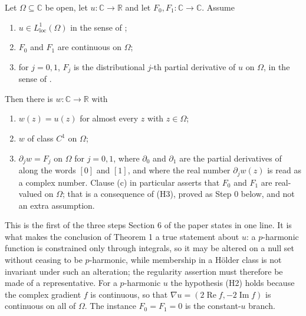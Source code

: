 \begin{lemma}
Let $\Omega\subseteq\mathbb{C}$ be open, let $u\colon\mathbb{C}\to\mathbb{R}$
and let $F_0,F_1\colon\mathbb{C}\to\mathbb{C}$.  Assume
\begin{enumerate}
\item[(H1)] $u\in L^1_{\mathrm{loc}}(\Omega)$ in the sense of
  ;
\item[(H2)] $F_0$ and $F_1$ are continuous on $\Omega$;
\item[(H3)] for $j=0,1$, $F_j$ is the distributional $j$-th partial derivative
  of $u$ on $\Omega$, in the sense of .
\end{enumerate}
Then there is $w\colon\mathbb{C}\to\mathbb{R}$ with
\begin{enumerate}
\item[(a)] $w(z)=u(z)$ for almost every $z$ with $z\in\Omega$;
\item[(b)] $w$ of class $C^1$ on $\Omega$;
\item[(c)] $\partial_jw=F_j$ on $\Omega$ for $j=0,1$, where $\partial_0$ and
  $\partial_1$ are the partial derivatives of  along the
  words $[0]$ and $[1]$, and where the real number $\partial_jw(z)$ is read as
  a complex number.  Clause (c) in particular asserts that $F_0$ and $F_1$ are
  real-valued on $\Omega$; that is a consequence of (H3), proved as Step 0
  below, and not an extra assumption.
\end{enumerate}

This is the first of the three steps Section 6 of the paper states in one line.
It is what makes the conclusion of Theorem 1 a true statement about $u$: a
$p$-harmonic function is constrained only through integrals, so it may be
altered on a null set without ceasing to be $p$-harmonic, while membership in a
H\"older class is not invariant under such an alteration; the regularity
assertion must therefore be made of a representative.  For a $p$-harmonic $u$
the hypothesis (H2) holds because the complex gradient $f$ is continuous, so
that $\nabla u=(2\operatorname{Re}f,-2\operatorname{Im}f)$ is continuous on all
of $\Omega$.  The instance $F_0=F_1=0$ is the constant-$u$ branch.
\end{lemma}

